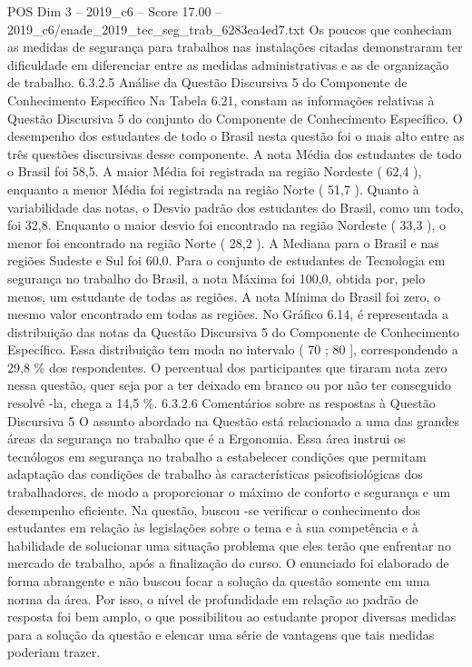 \begin{textsample}{POS Dim 3 – 2019\_c6 – Score 17.00 – 2019\_c6/enade\_2019\_tec\_seg\_trab\_6283ea4ed7.txt}
Os poucos que conheciam as medidas de segurança para trabalhos nas instalações citadas demonstraram ter dificuldade em diferenciar entre as medidas administrativas e as de organização de trabalho. 6.3.2.5 Análise da Questão Discursiva 5 do Componente de Conhecimento Específico Na Tabela 6.21, constam as informações relativas à Questão Discursiva 5 do conjunto do Componente de Conhecimento Específico.
O desempenho dos estudantes de todo o Brasil nesta questão foi o mais alto entre as três questões discursivas desse componente.
A nota Média dos estudantes de todo o Brasil foi 58,5.
A maior Média foi registrada na região Nordeste ( 62,4 ), enquanto a menor Média foi registrada na região Norte ( 51,7 ).
Quanto à variabilidade das notas, o Desvio padrão dos estudantes do Brasil, como um todo, foi 32,8.
Enquanto o maior desvio foi encontrado na região Nordeste ( 33,3 ), o menor foi encontrado na região Norte ( 28,2 ).
A Mediana para o Brasil e nas regiões Sudeste e Sul foi 60,0.
Para o conjunto de estudantes de Tecnologia em segurança no trabalho do Brasil, a nota Máxima foi 100,0, obtida por, pelo menos, um estudante de todas as regiões.
A nota Mínima do Brasil foi zero, o mesmo valor encontrado em todas as regiões.
No Gráfico 6.14, é representada a distribuição das notas da Questão Discursiva 5 do Componente de Conhecimento Específico.
Essa distribuição tem moda no intervalo ( 70 ; 80 ], correspondendo a 29,8 \% dos respondentes.
O percentual dos participantes que tiraram nota zero nessa questão, quer seja por a ter deixado em branco ou por não ter conseguido resolvê -la, chega a 14,5 \%. 6.3.2.6 Comentários sobre as respostas à Questão Discursiva 5 O assunto abordado na Questão está relacionado a uma das grandes áreas da segurança no trabalho que é a Ergonomia.
Essa área instrui os tecnólogos em segurança no trabalho a estabelecer condições que permitam adaptação das condições de trabalho às características psicofisiológicas dos trabalhadores, de modo a proporcionar o máximo de conforto e segurança e um desempenho eficiente.
Na questão, buscou -se verificar o conhecimento dos estudantes em relação às legislações sobre o tema e à sua competência e à habilidade de solucionar uma situação problema que eles terão que enfrentar no mercado de trabalho, após a finalização do curso.
O enunciado foi elaborado de forma abrangente e não buscou focar a solução da questão somente em uma norma da área.
Por isso, o nível de profundidade em relação ao padrão de resposta foi bem amplo, o que possibilitou ao estudante propor diversas medidas para a solução da questão e elencar uma série de vantagens que tais medidas poderiam trazer.

\end{textsample}
